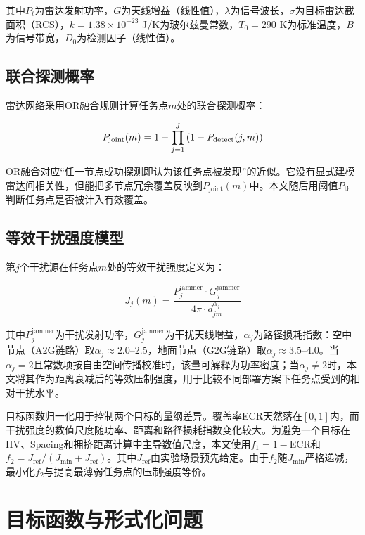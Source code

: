 其中$P_t$为雷达发射功率，$G$为天线增益（线性值），$\lambda$为信号波长，$\sigma$为目标雷达截面积（RCS），$k=1.38\times10^{-23}$ J/K为玻尔兹曼常数，$T_0=290$ K为标准温度，$B$为信号带宽，$D_0$为检测因子（线性值）。

\subsection{联合探测概率}

雷达网络采用OR融合规则计算任务点$m$处的联合探测概率：

\begin{equation}
P_{\text{joint}}(m) = 1 - \prod_{j=1}^{J} \left(1 - P_{\text{detect}}(j, m)\right)
\label{eq:joint_prob}
\end{equation}

OR融合对应“任一节点成功探测即认为该任务点被发现”的近似。它没有显式建模雷达间相关性，但能把多节点冗余覆盖反映到$P_{\text{joint}}(m)$中。本文随后用阈值$P_{\text{th}}$判断任务点是否被计入有效覆盖。

\subsection{等效干扰强度模型}

第$j$个干扰源在任务点$m$处的等效干扰强度定义为：

\begin{equation}
J_j(m) = \frac{P_j^{\text{jammer}} \cdot G_j^{\text{jammer}}}{4\pi \cdot d_{jm}^{\alpha_j}}
\label{eq:jamming}
\end{equation}

其中$P_j^{\text{jammer}}$为干扰发射功率，$G_j^{\text{jammer}}$为干扰天线增益，$\alpha_j$为路径损耗指数：空中节点（A2G链路）取$\alpha_j \approx 2.0$--2.5，地面节点（G2G链路）取$\alpha_j \approx 3.5$--4.0。当$\alpha_j=2$且常数项按自由空间传播校准时，该量可解释为功率密度；当$\alpha_j\neq 2$时，本文将其作为距离衰减后的等效压制强度，用于比较不同部署方案下任务点受到的相对干扰水平。

目标函数归一化用于控制两个目标的量纲差异。覆盖率ECR天然落在$[0,1]$内，而干扰强度的数值尺度随功率、距离和路径损耗指数变化较大。为避免一个目标在HV、Spacing和拥挤距离计算中主导数值尺度，本文使用$f_1=1-\text{ECR}$和$f_2=J_{\text{ref}}/(J_{\min}+J_{\text{ref}})$。其中$J_{\text{ref}}$由实验场景预先给定。由于$f_2$随$J_{\min}$严格递减，最小化$f_2$与提高最薄弱任务点的压制强度等价。

\section{目标函数与形式化问题}

